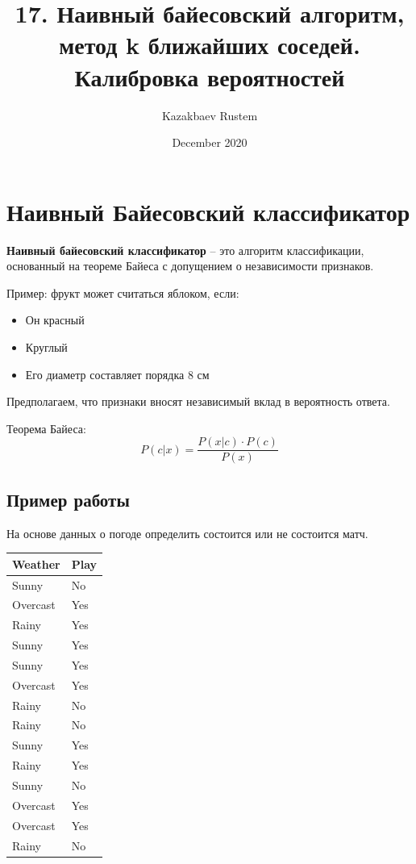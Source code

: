 \documentclass{article}
\title{17. Наивный байесовский алгоритм, метод k ближайших соседей. Калибровка вероятностей}
\author{Kazakbaev Rustem}
\date{December 2020}
\begin{document}
\maketitle


\section{Наивный Байесовский классификатор}
\textbf{Наивный байесовский классификатор} – это алгоритм классификации, основанный на теореме Байеса с допущением о независимости признаков.

Пример: фрукт может считаться яблоком, если:
\begin{itemize}
    \item Он красный
    \item Круглый
    \item Его диаметр составляет порядка 8 см
\end{itemize}
Предполагаем, что признаки вносят независимый вклад в вероятность ответа.

Теорема Байеса:
\begin{equation}
    P(c|x) = \frac{P(x|c) \cdot P(c)}{P(x)}
\end{equation}

\subsection{Пример работы}
На основе данных о погоде определить состоится или не состоится матч.

\begin{tabular}{|l|l|}
\hline Weather & Play \\
\hline Sunny & No \\
\hline Overcast & Yes \\
\hline Rainy & Yes \\
\hline Sunny & Yes \\
\hline Sunny & Yes \\
\hline Overcast & Yes \\
\hline Rainy & No \\
\hline Rainy & No \\
\hline Sunny & Yes \\
\hline Rainy & Yes \\
\hline Sunny & No \\
\hline Overcast & Yes \\
\hline Overcast & Yes \\
\hline Rainy & No \\
\hline
\end{tabular}
\end{document}
